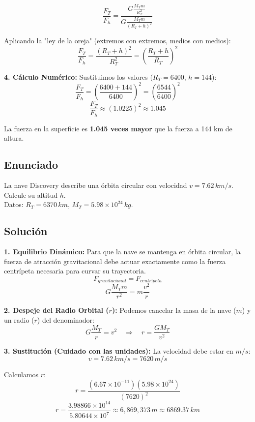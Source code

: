 \documentclass[12pt, a4paper]{article}
\begin{document}
$$ \frac{F_T}{F_h} = \frac{ G \frac{M_T m}{R_T^2} }{ G \frac{M_T m}{(R_T + h)^2} } $$

Aplicando la "ley de la oreja" (extremos con extremos, medios con medios):
$$ \frac{F_T}{F_h} = \frac{(R_T + h)^2}{R_T^2} = \left( \frac{R_T + h}{R_T} \right)^2 $$

\textbf{4. Cálculo Numérico:}
Sustituimos los valores ($R_T = 6400$, $h = 144$):
$$ \frac{F_T}{F_h} = \left( \frac{6400 + 144}{6400} \right)^2 = \left( \frac{6544}{6400} \right)^2 $$
$$ \frac{F_T}{F_h} \approx (1.0225)^2 \approx 1.045 $$

\begin{tcolorbox}[colback=green!5!white,title=Conclusión]
La fuerza en la superficie es \textbf{1.045 veces mayor} que la fuerza a 144 km de altura.
\end{tcolorbox}

\newpage

\subsection*{Enunciado}
La nave Discovery describe una órbita circular con velocidad $v = 7.62 \, \si{km/s}$. Calcule su altitud $h$.
\\
Datos: $R_T = 6370 \, \si{km}$, $M_T = 5.98 \times 10^{24} \, \si{kg}$.

\subsection*{Solución}

\textbf{1. Equilibrio Dinámico:}
Para que la nave se mantenga en órbita circular, la fuerza de atracción gravitacional debe actuar exactamente como la fuerza centrípeta necesaria para curvar su trayectoria.
$$ F_{gravitacional} = F_{centrípeta} $$
$$ G \frac{M_T m}{r^2} = m \frac{v^2}{r} $$

\textbf{2. Despeje del Radio Orbital ($r$):}
Podemos cancelar la masa de la nave ($m$) y un radio ($r$) del denominador:
$$ G \frac{M_T}{r} = v^2 \quad \Rightarrow \quad r = \frac{G M_T}{v^2} $$

\textbf{3. Sustitución (Cuidado con las unidades):}
La velocidad debe estar en $\si{m/s}$:
$$ v = 7.62 \, \si{km/s} = 7620 \, \si{m/s} $$

Calculamos $r$:
$$ r = \frac{(6.67 \times 10^{-11})(5.98 \times 10^{24})}{(7620)^2} $$
$$ r = \frac{3.98866 \times 10^{14}}{5.80644 \times 10^7} \approx 6,869,373 \, \si{m} \approx 6869.37 \, \si{km} $$
\end{document}
